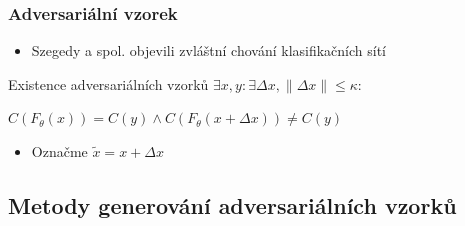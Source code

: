 \documentclass[czech]{beamer}
\begin{document}
\begin{frame}
    \frametitle{Adversariální vzorek}
    \begin{itemize}
        \item Szegedy a spol. objevili zvláštní chování klasifikačních sítí \cite{szegedy2014intriguing}
    \end{itemize}
    \begin{block}{Existence adversariálních vzorků}
        \centering
        $\exists x, y : \exists \Delta x, \|\Delta x\| \leq \kappa : $

        $C(F_\theta(x)) = C(y) \land C(F_\theta(x + \Delta x)) \neq C(y)$
    \end{block}
    \begin{itemize}
        \item Označme $\tilde{x} = x + \Delta x$
    \end{itemize}
\end{frame}

\subsection{Metody generování adversariálních vzorků}
\end{document}
